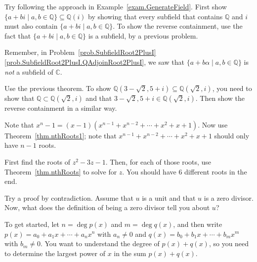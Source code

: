 \begin{hint*}
Try following the approach in Example~\ref{exam.GenerateField}. First show  $\{a+bi\mid a,b\in \mathbb{Q}\} \subseteq \mathbb{Q}(i)$ by showing that every subfield that contains $\mathbb{Q}$ and $i$ must also contain $\{a+bi\mid a,b\in \mathbb{Q}\}$. To show the reverse containment, use the fact that $\{a+bi\mid a,b\in \mathbb{Q}\}$ is a subfield, by a previous problem.
\end{hint*}

\begin{hint*}
Remember, in Problem~\ref{prob.SubfieldRoot2PlusI}\ref{prob.SubfieldRoot2PlusI.QAdjoinRoot2PlusI}, we saw that $\{a+b\alpha\mid a,b\in \mathbb{Q}\}$ is \emph{not} a subfield of $\mathbb{C}$.
\end{hint*}

\begin{hint*}
Use the previous theorem. To show  $\mathbb{Q}\left(3-\sqrt{2},5+i\right) \subseteq \mathbb{Q}\left(\sqrt{2},i\right)$, you need to show that $\mathbb{Q}\subset \mathbb{Q}\left(\sqrt{2},i\right)$ and that $3-\sqrt{2},5+i\in \mathbb{Q}\left(\sqrt{2},i\right)$. Then show the reverse containment in a similar way.
\end{hint*}

\begin{hint*}
Note that $x^n - 1 = (x-1)(x^{n-1} + x^{n-2} + \cdots + x^2 + x + 1)$. Now use Theorem~\ref{thm.nthRoots1}; note that $x^{n-1} + x^{n-2} + \cdots + x^2 + x + 1$ should only have  $n-1$ roots.
\end{hint*}

\begin{hint*}
First find the roots of $z^2 - 3z - 1$. Then, for each of those roots, use Theorem~\ref{thm.nthRoots} to solve for $z$. You should have 6 different roots in the end.
\end{hint*}

\begin{hint*}
Try a proof by contradiction. Assume that $u$ is a unit and that $u$ is a zero divisor. Now, what does the definition of being a zero divisor tell you about $u$?
\end{hint*}

\begin{hint*}
To get started, let $n = \deg p(x)$ and $m = \deg q(x)$, and then write $p(x) = a_0 + a_1x + \cdots + a_nx^n$ with $a_n\neq 0$ and $q(x) = b_0 + b_1x + \cdots + b_mx^m$ with $b_m\neq 0$. You want to understand the degree of $p(x) + q(x)$, so you need to determine the largest power of $x$ in the sum $p(x) + q(x)$.
\end{hint*}

